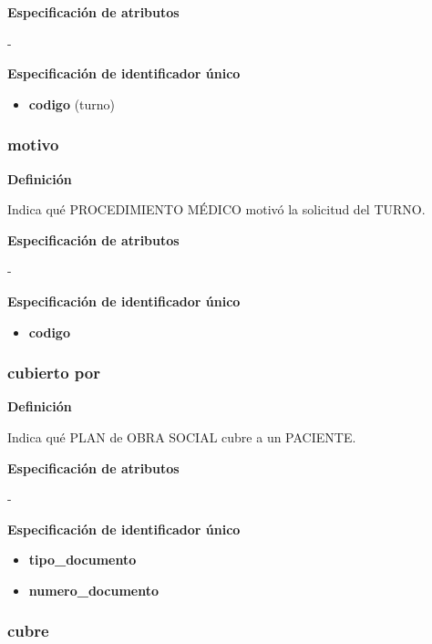 \documentclass[a4paper,11pt]{article}
\begin{document}
\textbf{Especificación de atributos}

-

\textbf{Especificación de identificador único}

\begin{itemize}

     \item \textbf{codigo} (turno)

\end{itemize}

\subsubsection{\textbf{motivo}}

\textbf{Definición}

Indica qué PROCEDIMIENTO MÉDICO motivó la solicitud del TURNO.

\textbf{Especificación de atributos}

-

\textbf{Especificación de identificador único}

\begin{itemize}

     \item \textbf{codigo}

\end{itemize}

\subsubsection{\textbf{cubierto por}}

\textbf{Definición}

Indica qué PLAN de OBRA SOCIAL cubre a un PACIENTE.

\textbf{Especificación de atributos}

-

\textbf{Especificación de identificador único}

\begin{itemize}

     \item \textbf{tipo\_documento}

     \item \textbf{numero\_documento}

\end{itemize}

\subsubsection{\textbf{cubre}}
\end{document}
